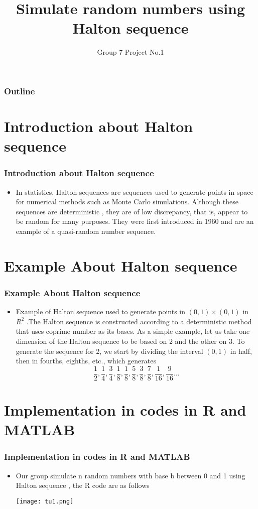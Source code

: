 \documentclass[12pt]{beamer}
\title{Simulate random numbers using Halton sequence}
\author{Group 7 Project No.1}
\date[July 17$^{th}, 2016$]
\begin{document}
	
\begin{frame}
	\titlepage
\end{frame}


\begin{frame}
	\frametitle{Outline}
	\tableofcontents
\end{frame}
\section{Introduction about Halton sequence}
\begin{frame}
	\frametitle{Introduction about Halton sequence}
   \begin{itemize}
	\item  In statistics, Halton sequences are sequences used to generate points in space for numerical methods such as Monte Carlo simulations. Although these sequences are deterministic , they are of low discrepancy, that is, appear to be random for many purposes. They were first introduced in 1960 and are an example of a quasi-random number sequence.
\end{itemize}
\end{frame}

\section{Example About Halton sequence}
\begin{frame}
	\frametitle{Example About Halton sequence}
	\begin{itemize}
		\item Example of Halton sequence used to generate points in $(0,1)\times(0,1)$ in $R^{2}$ .The Halton sequence is constructed according to a deterministic method that uses coprime number as its bases. As a simple example, let us take one dimension of the Halton sequence to be based on 2 and the other on 3. To generate the sequence for 2, we start by dividing the interval $(0,1)$ in half, then in fourths, eighths, etc., which generates
$$\frac{1}{2},\frac{1}{4},\frac{3}{4},\frac{1}{8},\frac{1}{8},\frac{5}{8},\frac{3}{8},\frac{7}{8},\frac{1}{16},\frac{9}{16}\dots$$
   \end{itemize}
\end{frame}

\section{Implementation in codes in R and MATLAB}
\begin{frame}
	\frametitle{Implementation in codes in R and MATLAB}
	\begin{itemize}
		\item Our group simulate n random numbers with base b between 0 and 1 using Halton sequence , the R code are as follows
           \begin{center}
        \texttt{[image: tu1.png]}
        \end{center}
	\end{itemize}
\end{frame}
\end{document}
